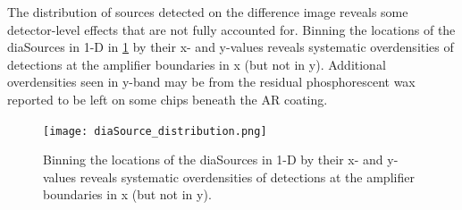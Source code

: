 The distribution of sources detected on the difference image reveals some detector-level effects that are not fully accounted for.
Binning the locations of the diaSources in 1-D in \ref{fig:diaSource-distribution} by their x- and y-values reveals systematic overdensities of detections at the amplifier boundaries in x (but not in y).
Additional overdensities seen in y-band may be from the residual phosphorescent wax reported to be left on some chips beneath the AR coating.

\begin{figure}
\texttt{[image: diaSource\_distribution.png]}
\caption{Binning the locations of the diaSources in 1-D by their x- and y-values reveals systematic overdensities of detections at the amplifier boundaries in x (but not in y). \label{fig:diaSource-distribution}}
\end{figure}









